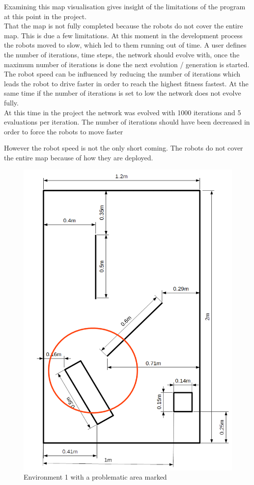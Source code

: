 Examining this map visualisation gives insight of the limitations of the program at this point in the project.\\
That the map is not fully completed because the robots do not cover the entire map. This is due a few limitations. At this moment in the development process the robots moved to slow, which led to them running out of time. 
A user defines the number of iterations, time steps,  the network should evolve with, once the maximum number of iterations is done the next evolution / generation is started.\\
The robot speed can be influenced by reducing the number of iterations which leads the robot to drive faster in order to reach the highest fitness fastest. At the same time if the number of iterations is set to low the network does not evolve fully. \\
At this time in the project the network was evolved with 1000 iterations and 5 evaluations per iteration.  The number of iterations should have been decreased in order to force the robots to move faster 

However the robot speed is not the only short coming. The robots do not cover the entire map because of how they are deployed. \\

\begin{figure}[h]
\centering
\includegraphics[scale=0.4]{Chapter4/images/environment_marked1}
\caption{Environment 1 with a problematic area marked}
\label{fig:enviro_marked1}
\end{figure}

